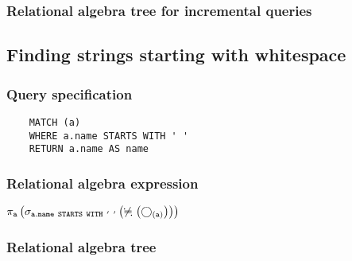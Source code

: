 	\subsubsection*{Relational algebra tree for incremental queries}

	\subsection{Finding strings starting with whitespace}

	\subsubsection*{Query specification}

	\begin{lstlisting}
	MATCH (a)
	WHERE a.name STARTS WITH ' '
	RETURN a.name AS name
	\end{lstlisting}


	\subsubsection*{Relational algebra expression}

	$\projection{\var{a}} \left(\selection{\mathtt{a.name~STARTS~WITH~'~'}} \left(\alldifferent{} \left(\getvertices{a}{}\right)\right)\right)$

	\subsubsection*{Relational algebra tree}


